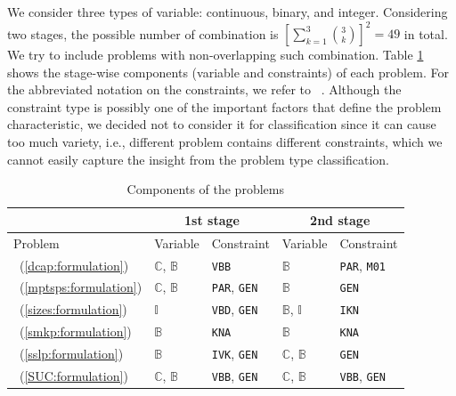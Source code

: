 We consider three types of variable: continuous, binary, and integer. Considering two stages, the possible number of combination is $\left[\sum_{k=1}^3\binom{3}{k}\right]^2=49$ in total. We try to include problems with non-overlapping such combination. Table \ref{table:prob_class} shows the stage-wise components (variable and constraints) of each problem. For the abbreviated notation on the constraints, we refer to \miplib\ \cite{MIPLIB}. Although the constraint type is possibly one of the important factors that define the problem characteristic, we decided not to consider it for classification since it can cause too much variety, i.e., different problem contains different constraints, which we cannot easily capture the insight from the problem type classification. 
\begin{table}[H]
	\centering
	\caption{Components of the problems}
	\label{table:prob_class}
	\begin{threeparttable}
		\begin{tabular}{@{}lllll@{}}
			\toprule
			& \multicolumn{2}{c}{1st stage}                              				  	& \multicolumn{2}{c}{2nd stage}                             			        \\ \midrule
			Problem 	     & Variable                    & Constraint                   	& Variable                    & Constraint                  				    \\ \midrule
			\dcap\ (\ref{dcap:formulation})    & $\mathbb{C}$, $\mathbb{B}$  & \texttt{VBB}                	& $\mathbb{B}$                & \texttt{PAR}, \texttt{M01} 			    		\\
			\mptsps\ (\ref{mptsps:formulation})  & $\mathbb{C}$, $\mathbb{B}$  & \texttt{PAR}, \texttt{GEN}		& $\mathbb{B}$                & \texttt{GEN}               						\\
			\sizes\ (\ref{sizes:formulation})   & $\mathbb{I}$ 			   & \texttt{VBD}, \texttt{GEN} 	& $\mathbb{B}$, $\mathbb{I}$  & \texttt{IKN}             						\\
			\smkp\ (\ref{smkp:formulation})   & $\mathbb{B}$                & \texttt{KNA}                	& $\mathbb{B}$                & \texttt{KNA}              						\\
			\sslp\ (\ref{sslp:formulation})   & $\mathbb{B}$                & \texttt{IVK}, \texttt{GEN} 	& $\mathbb{C}$, $\mathbb{B}$  & \texttt{GEN}             						\\
			\suc\ (\ref{SUC:formulation})   & $\mathbb{C}$, $\mathbb{B}$                 & \texttt{VBB}, \texttt{GEN}                            	& $\mathbb{C}$, $\mathbb{B}$  &  \texttt{VBB}, \texttt{GEN}                                  					\\ \bottomrule
		\end{tabular}
		

\end{threeparttable}
\end{table}
